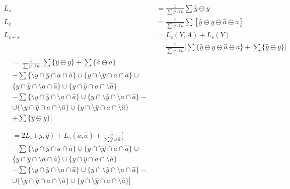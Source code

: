 \begin{align}
L_s &= \frac{1}{\sum \hat{y} \cup \hat{a}} \sum \hat{y}\ominus y \\
L_c &= \frac{1}{\sum \hat{y} \cup \hat{a}}\sum  [\hat{y}\ominus y\ominus \hat{a} \ominus a  ]\\
L_{c+s} &= L_c(Y, A) + L_s(Y)\\
&=\frac{1}{\sum \hat{y} \cup \hat{a}} \Bigg[\sum  \{\hat{y}\ominus y\ominus \hat{a} \ominus a  \} + \sum \{\hat{y}\ominus y\}  \Bigg]\\
\begin{split}
&=\frac{1}{\sum \hat{y} \cup \hat{a}} \Bigg[\sum \{\hat{y}\ominus y\} + \sum  \{\hat{a}\ominus a\}\\
&-\sum \{\setminus y\cap \hat{y} \cap a \cap \hat{a}\}\cup\{y\cap \setminus \hat{y} \cap a \cap \hat{a}\}\cup \\ 
&\{y\cap \hat{y} \cap \setminus a \cap \hat{a}\}\cup\{y\cap \hat{y} \cap a \cap \setminus \hat{a}\}\\
&-\sum\{\setminus y\cap \hat{y} \cap \setminus a \cap \hat{a}\} \cup\{y\cap \setminus \hat{y} \cap \setminus a \cap \hat{a}\} -\\
&\cup\{\setminus y\cap \hat{y} \cap a \cap \setminus\hat{a}\}\cup\{y\cap \setminus \hat{y} \cap a \cap \setminus \hat{a}\} \\ 
&+\sum \{\hat{y}\ominus y\}   \Bigg]\\
\end{split}\\
\begin{split}
&=2L_s(y, \hat{y})+L_s(a, \hat{a}) +\frac{1}{\sum \hat{y} \cup \hat{a}} \Bigg[\\
&-\sum \{\setminus y\cap \hat{y} \cap a \cap \hat{a}\}\cup\{y\cap \setminus \hat{y} \cap a \cap \hat{a}\}\cup \\ 
&\{y\cap \hat{y} \cap \setminus a \cap \hat{a}\}\cup\{y\cap \hat{y} \cap a \cap \setminus \hat{a}\}\\
&-\sum\{\setminus y\cap \hat{y} \cap \setminus a \cap \hat{a}\} \cup\{y\cap \setminus \hat{y} \cap \setminus a \cap \hat{a}\} -\\
&\cup\{\setminus y\cap \hat{y} \cap a \cap \setminus\hat{a}\}\cup\{y\cap \setminus \hat{y} \cap a \cap \setminus \hat{a}\}   \Bigg]
\end{split} \label{loss_proof}
\end{align}

